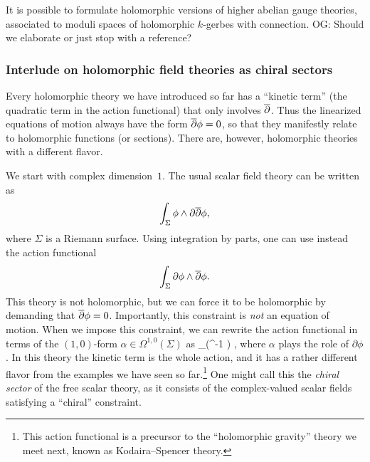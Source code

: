 \documentclass[11pt]{amsart}
\def\del{\partial}
\def\owen#1{{\textcolor{violet!50!black}{OG: {#1}}}}
\begin{document}
It is possible to formulate holomorphic versions of higher abelian gauge theories,
associated to moduli spaces of holomorphic $k$-gerbes with connection.
\owen{Should we elaborate or just stop with a reference?}

\subsubsection{Interlude on holomorphic field theories as chiral sectors}

Every holomorphic theory we have introduced so far has a ``kinetic term'' (the quadratic term in the action functional) that only involves ${\overline{\partial}}$.
Thus the linearized equations of motion always have the form ${\overline{\partial}} \phi = 0$,
so that they manifestly relate to holomorphic functions (or sections).
There are, however, holomorphic theories with a different flavor.

\begin{comment}
A typical scalar field theory is the free boson which exists on any Riemannian manifold $\Sigma$.
Its action functional is simply $\int_\Sigma \phi \triangle \phi$ where $\phi$ is a smooth function on $\Sigma$.
We saved this example for last since its holomorphic analog is a bit more elusive than the previous examples.
\end{comment}

We start with complex dimension~$1$.
The usual scalar field theory can be written as 
\[
\int_{\Sigma} \phi \wedge \del \dbar \phi, 
\]
where $\Sigma$ is a Riemann surface.
Using integration by parts, one can use instead the action functional
\[
\int_{\Sigma} \partial \phi \wedge {\overline{\partial}} \phi.
\]
This theory is not holomorphic, but we can force it to be holomorphic by demanding that ${\overline{\partial}} \phi = 0$.
Importantly, this constraint is \textit{not} an equation of motion.
When we impose this constraint, we can rewrite the action functional in terms of the $(1,0)$-form $\alpha \in \Omega^{1,0}(\Sigma)$ as
\beqn\label{eqn:scalar1}
\int_\Sigma \alpha \wedge \dbar (\del^{-1} \alpha) ,
\eeqn
where $\alpha$ plays the role of $\partial \phi$.
In this theory the kinetic term is the whole action,
and it has a rather different flavor from the examples we have seen so far.\footnote{This action functional is a precursor to the ``holomorphic gravity'' theory we meet next, 
known as Kodaira--Spencer theory.}
One might call this the {\em chiral sector} of the free scalar theory,
as it consists of the complex-valued scalar fields satisfying a ``chiral'' constraint.
\end{document}
